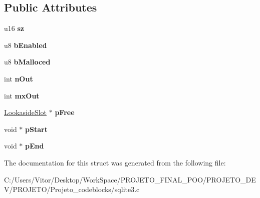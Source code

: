 \subsection*{Public Attributes}
\begin{DoxyCompactItemize}
\item 
\hypertarget{struct_lookaside_a2e8346b6cebbb64d9a6886a19ef843a1}{u16 {\bfseries sz}}\label{struct_lookaside_a2e8346b6cebbb64d9a6886a19ef843a1}

\item 
\hypertarget{struct_lookaside_adbe2c3486f893c30525e19388f35eb21}{u8 {\bfseries b\-Enabled}}\label{struct_lookaside_adbe2c3486f893c30525e19388f35eb21}

\item 
\hypertarget{struct_lookaside_a218f14cf9eb2c430867d286e9ac57ac5}{u8 {\bfseries b\-Malloced}}\label{struct_lookaside_a218f14cf9eb2c430867d286e9ac57ac5}

\item 
\hypertarget{struct_lookaside_a4cdd49fa554f877928d5bb31d55b32e9}{int {\bfseries n\-Out}}\label{struct_lookaside_a4cdd49fa554f877928d5bb31d55b32e9}

\item 
\hypertarget{struct_lookaside_a2ce364d95b55913df986999de442e4f9}{int {\bfseries mx\-Out}}\label{struct_lookaside_a2ce364d95b55913df986999de442e4f9}

\item 
\hypertarget{struct_lookaside_a318d2faa7f976f9d1b3c6e08bdc1d992}{\hyperlink{struct_lookaside_slot}{Lookaside\-Slot} $\ast$ {\bfseries p\-Free}}\label{struct_lookaside_a318d2faa7f976f9d1b3c6e08bdc1d992}

\item 
\hypertarget{struct_lookaside_a47073fcdffdc5a7a1464f0d09bfc17f9}{void $\ast$ {\bfseries p\-Start}}\label{struct_lookaside_a47073fcdffdc5a7a1464f0d09bfc17f9}

\item 
\hypertarget{struct_lookaside_ad3555c5558e104f2b82f62bf642cf831}{void $\ast$ {\bfseries p\-End}}\label{struct_lookaside_ad3555c5558e104f2b82f62bf642cf831}

\end{DoxyCompactItemize}


The documentation for this struct was generated from the following file\-:\begin{DoxyCompactItemize}
\item 
C\-:/\-Users/\-Vitor/\-Desktop/\-Work\-Space/\-P\-R\-O\-J\-E\-T\-O\-\_\-\-F\-I\-N\-A\-L\-\_\-\-P\-O\-O/\-P\-R\-O\-J\-E\-T\-O\-\_\-\-D\-E\-V/\-P\-R\-O\-J\-E\-T\-O/\-Projeto\-\_\-codeblocks/sqlite3.\-c\end{DoxyCompactItemize}

